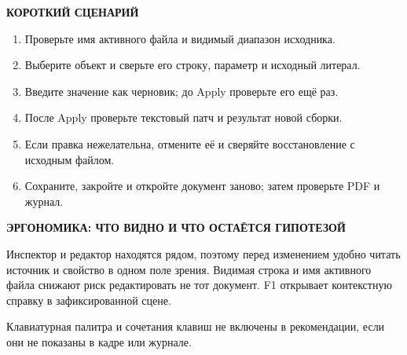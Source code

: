 \documentclass[10pt,a4paper,landscape]{article}
\newcommand{\eyebrow}[1]{{\small\sffamily\bfseries\color{Teal}\MakeUppercase{#1}}\par\vspace{2pt}}
\begin{document}
\begin{minipage}[t]{0.48\linewidth}
\eyebrow{Короткий сценарий}
\begin{enumerate}[leftmargin=1.3em,itemsep=4pt]
  \item Проверьте имя активного файла и видимый диапазон исходника.
  \item Выберите объект и сверьте его строку, параметр и исходный литерал.
  \item Введите значение как черновик; до Apply проверьте его ещё раз.
  \item После Apply проверьте текстовый патч и результат новой сборки.
  \item Если правка нежелательна, отмените её и сверяйте восстановление с исходным файлом.
  \item Сохраните, закройте и откройте документ заново; затем проверьте PDF и журнал.
\end{enumerate}
\end{minipage}\hfill
\begin{minipage}[t]{0.47\linewidth}
\eyebrow{Эргономика: что видно и что остаётся гипотезой}
Инспектор и редактор находятся рядом, поэтому перед изменением удобно читать источник и свойство в одном поле зрения. Видимая строка и имя активного файла снижают риск редактировать не тот документ. F1 открывает контекстную справку в зафиксированной сцене.

Клавиатурная палитра и сочетания клавиш не включены в рекомендации, если они не показаны в кадре или журнале.

\GuideReplayErgo
\end{minipage}
\newpage
\GuidePages
\end{document}

